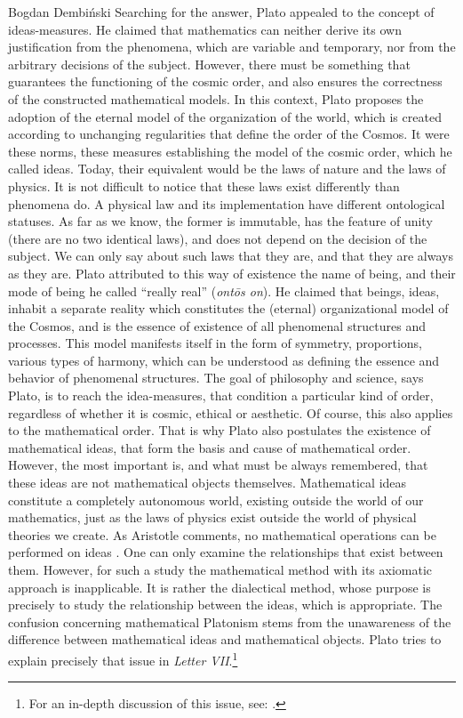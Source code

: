 \begin{artengenv}{Bogdan Dembiński}
Searching for the answer, Plato appealed to the concept of ideas-measures. He claimed that mathematics can neither
derive its own justification from the phenomena, which are variable and temporary, nor from the arbitrary decisions of
the subject. However, there must be something that guarantees the functioning of the cosmic order, and also ensures the
correctness of the constructed mathematical models. In this context, Plato proposes the %
adoption of the eternal model of the organization of the world, which is created according to unchanging regularities
that define the order of the Cosmos. It were these norms, these measures establishing the model of the cosmic order,
which he called ideas. Today, their equivalent would be the laws of nature and the laws of physics. It is not difficult
to notice that these laws exist differently than phenomena do. A physical law and its implementation have different
ontological statuses. As far as we know, the former is immutable, has the feature of unity (there are no two identical
laws), and does not depend on the decision of the subject. We can only say about such laws that they are, and that they
are always as they are. Plato attributed to this way of existence the name of being, and their mode of being he called
``really real'' (\textit{ont\=os on}). He claimed that beings, ideas, inhabit a separate
reality which constitutes the (eternal) organizational model of the Cosmos, and is the essence of existence of all
phenomenal structures and processes. This model manifests itself in the form of symmetry, proportions, various types of
harmony, which can be understood as defining the essence and behavior of phenomenal structures. The goal of philosophy
and science, says Plato, is to reach the idea-measures, that condition a particular kind of order, regardless of
whether it is cosmic, ethical or aesthetic. Of course, this also applies to the mathematical order. That is why Plato
also postulates the existence of mathematical ideas, that form the basis and cause of mathematical order. However, the
most important is, and what must be always remembered, that these ideas are not mathematical objects themselves.
Mathematical ideas constitute a completely autonomous world, existing outside the world of our mathematics, just as the
laws of physics exist outside the world of physical theories we create. As Aristotle comments, no mathematical
operations can be performed on ideas
\parencite[Metaphysica, 1081a]{aristotle_aristotles_1924}.
One can only
examine the relationships that exist between them. However, for such a study the mathematical method with its axiomatic
approach is inapplicable. It is rather the dialectical method, whose purpose is precisely to study the relationship
between the ideas, which is appropriate. The confusion concerning mathematical Platonism stems from the unawareness of the
difference between mathematical ideas and mathematical objects. Plato tries to explain precisely that issue in
\textit{Letter VII}.\footnote{For an in-depth discussion of this issue, see:
\parencite[pp.55–110]{dembinski_pozna_2003}.
}


\end{artengenv}

